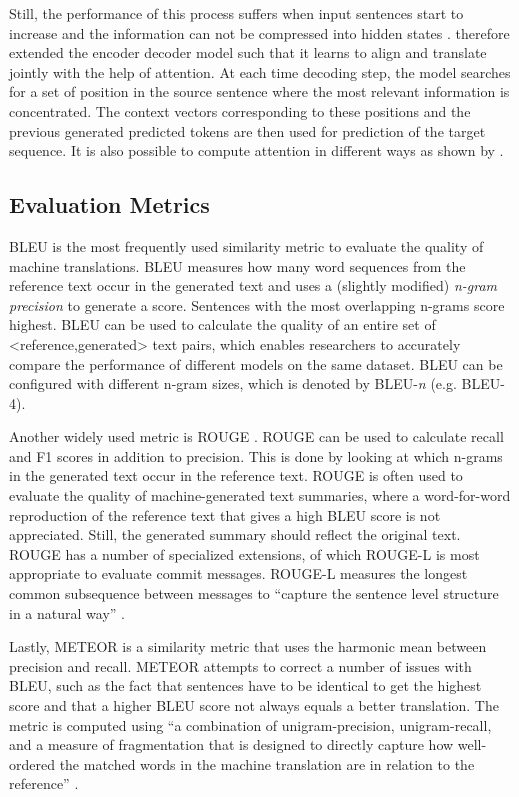 Still, the performance of this process suffers when input sentences start to increase and the information can not be compressed into hidden states \cite{cho2014learning}. \citeauthor{bahdanau2014neural} \cite{bahdanau2014neural} therefore extended the encoder decoder model such that it learns to align and translate jointly with the help of attention. At each time decoding step, the model searches for a set of position in the source sentence where the most relevant information is concentrated. The context vectors corresponding to these positions and the previous generated predicted tokens are then used for prediction of the target sequence. It is also possible to compute attention in different ways as shown by \citeauthor{luong2015effective} \cite{luong2015effective}.

\subsection{Evaluation Metrics}
BLEU \citep{papineni_bleu:_2001} is the most frequently used similarity metric to evaluate the quality of machine translations. BLEU measures how many word sequences from the reference text occur in the generated text and uses a (slightly modified) \textit{n-gram precision} to generate a score. Sentences with the most overlapping n-grams score highest. BLEU can be used to calculate the quality of an entire set of <reference,generated> text pairs, which enables researchers to accurately compare the performance of different models on the same dataset. BLEU can be configured with different n-gram sizes, which is denoted by BLEU-\textit{n} (e.g. BLEU-4).

Another widely used metric is ROUGE \citep{lin_rouge:_2004}. ROUGE can be used to calculate recall and F1 scores in addition to precision. This is done by looking at which n-grams in the generated text occur in the reference text. ROUGE is often used to evaluate the quality of machine-generated text summaries, where a word-for-word reproduction of the reference text that gives a high BLEU score is not appreciated. Still, the generated summary should reflect the original text. ROUGE has a number of specialized extensions, of which ROUGE-L is most appropriate to evaluate commit messages. ROUGE-L measures the longest common subsequence between messages to ``capture the sentence level structure in a natural way'' \citep{lin_rouge:_2004}.

Lastly, METEOR is a similarity metric that uses the harmonic mean between precision and recall. METEOR attempts to correct a number of issues with BLEU, such as the fact that sentences have to be identical to get the highest score and that a higher BLEU score not always equals a better translation. The metric is computed using ``a combination of unigram-precision, unigram-recall, and a measure of fragmentation that is designed to directly capture how well-ordered the matched words in the machine translation are in relation to the reference'' \citep{banerjee_meteor:_2005}.


